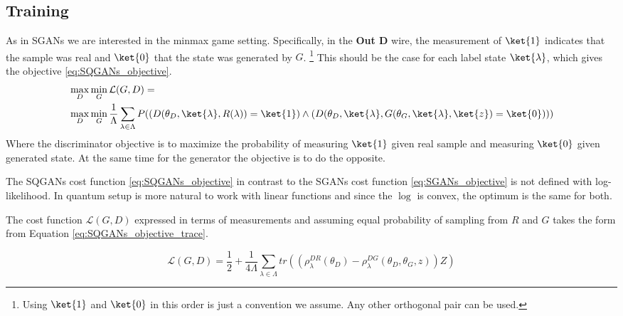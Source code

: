 \subsection{Training}
As in SGANs we are interested in the minmax game setting. Specifically, in
the \textbf{Out D} wire, the measurement of $\ket{1}$ indicates that the sample
was real and $\ket{0}$ that the state was generated by $G$.
\footnote{Using $\ket{1}$ and $\ket{0}$ in this order is just a convention we
  assume. Any other orthogonal pair can be used.}
This should be the case for each label state $\ket{\lambda}$, which gives the
objective \ref{eq:SQGANs_objective}. 
\begin{equation}
  \begin{split}
  \label{eq:SQGANs_objective}
  & \max_{D}\min_{G} \mathcal{L}(G, D) = \\
  & \max_{D}\min_{G}  \frac{1}{\Lambda}\sum_{\lambda \in \Lambda}{P((D(\theta_D, \ket{\lambda}, R(\lambda)) = \ket{1}) \land (D(\theta_D, \ket{\lambda}, G(\theta_G, \ket{\lambda}, \ket{z}) = \ket{0})))}
  \end{split}
\end{equation} 
Where the discriminator objective is to maximize the probability of measuring $\ket{1}$
given real sample and measuring $\ket{0}$ given generated state. At the same
time for the generator the objective is to do the opposite.

The SQGANs cost function \ref{eq:SQGANs_objective} in contrast to the SGANs cost
function \ref{eq:SGANs_objective} is not defined with log-likelihood. In quantum
setup is more natural to work with linear functions and since the $\log$ is
convex, the optimum is the same for both.

The cost function $\mathcal{L}(G, D)$ expressed in terms of measurements and
assuming equal probability of sampling from $R$ and $G$ takes the form from
Equation \ref{eq:SQGANs_objective_trace}\cite{Dallaire_Demers_2018}.

\begin{equation}
  \label{eq:SQGANs_objective_trace}
  \mathcal{L}(G, D) = \frac{1}{2} + \frac{1}{4\Lambda}\sum_{\lambda \in
  \Lambda}{}tr((\rho_\lambda^{DR}(\theta_D) - \rho_\lambda^{DG}(\theta_D, \theta_G, z))Z)
\end{equation}


